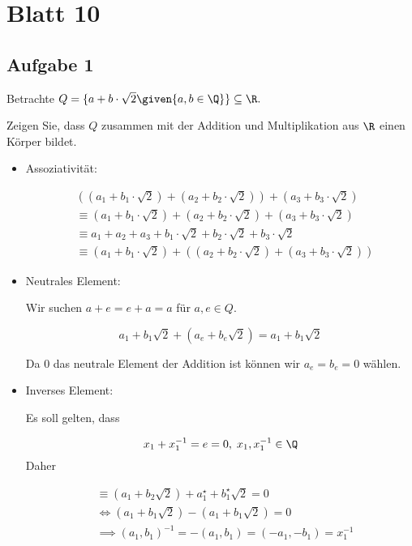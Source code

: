 \section*{Blatt 10}
%

\subsection*{Aufgabe 1}

Betrachte $Q = \{a + b \cdot \sqrt{2} \given{ a, b \in \Q}\} \subseteq \R.$

Zeigen Sie, dass $Q$ zusammen mit der Addition und Multiplikation aus $\R$ einen Körper bildet.

\begin{itemize}
  \item Assoziativität:

  \begin{align*}
    &((a_1 + b_1 \cdot \sqrt{2}) + (a_2 + b_2 \cdot \sqrt{2})) + (a_3 + b_3 \cdot \sqrt{2}) \\
    &\equiv (a_1 + b_1 \cdot \sqrt{2}) + (a_2 + b_2 \cdot \sqrt{2}) + (a_3 + b_3 \cdot \sqrt{2}) \\
    &\equiv a_1 + a_2 + a_3 + b_1 \cdot \sqrt{2} + b_2 \cdot \sqrt{2} + b_3 \cdot \sqrt{2} \\
    &\equiv (a_1 + b_1 \cdot \sqrt{2}) + ((a_2 + b_2 \cdot \sqrt{2}) + (a_3 + b_3 \cdot \sqrt{2}))
  \end{align*}

  \item Neutrales Element:

  Wir suchen $a + e = e + a = a$ für $a, e \in Q$.

  \[  a_1 + b_1 \sqrt{2} + (a_e + b_e \sqrt{2}) = a_1 + b_1 \sqrt{2}  \]

  Da 0 das neutrale Element der Addition ist können wir $a_e = b_e = 0$ wählen.

  \item Inverses Element:

  Es soll gelten, dass

  \[  x_1 + x_1^{-1} = e = 0, \; x_1, x_1^{-1} \in \Q  \]
 Daher

 \begin{align*}
   &\equiv (a_1 + b_2 \sqrt{2}) + a_1^{\star} + b_1^{\star}\sqrt{2} = 0 \\
   &\iff (a_1 + b_1 \sqrt{2}) - (a_1 + b_1 \sqrt{2}) = 0 \\
   &\implies (a_1, b_1)^{-1} = -(a_1, b_1) = (-a_1, -b_1) = x_1^{-1}
 \end{align*}


\end{itemize}
